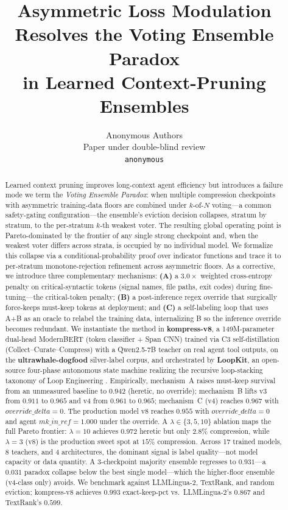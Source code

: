 \documentclass[10pt,letterpaper]{article}
\title{Asymmetric Loss Modulation Resolves the Voting Ensemble Paradox\\
       in Learned Context-Pruning Ensembles}
\author{Anonymous Authors\\
        Paper under double-blind review\\
        \texttt{anonymous}}  %
\date{}
\begin{document}
\maketitle

\begin{abstract}
Learned context pruning improves long-context agent efficiency but introduces
a failure mode we term the \emph{Voting Ensemble Paradox}: when multiple
compression checkpoints with asymmetric training-data floors are combined
under $k$-of-$N$ voting---a common safety-gating configuration---the
ensemble's eviction decision collapses, stratum by stratum, to the
per-stratum $k$-th weakest voter. The resulting global operating point is
Pareto-dominated by the frontier of any single strong checkpoint and, when
the weakest voter differs across strata, is occupied by no individual model.
We formalize this collapse via a conditional-probability proof over
indicator functions and trace it to per-stratum monotone-rejection
refinement across asymmetric floors. As a corrective, we introduce three
complementary mechanisms: \textbf{(A)} a $3.0\times$ weighted
cross-entropy penalty on critical-syntactic tokens (signal names, file
paths, exit codes) during fine-tuning---the critical-token penalty; \textbf{(B)}
a post-inference regex override that surgically force-keeps must-keep
tokens at deployment; and \textbf{(C)} a self-labeling loop that uses
A+B as an oracle to relabel the training data, internalizing B so the
inference override becomes redundant. We instantiate the method in
\textbf{kompress-v8}, a 149M-parameter dual-head ModernBERT (token
classifier + Span CNN) trained via C3 self-distillation
(Collect--Curate--Compress) with a Qwen2.5-7B teacher on real agent tool
outputs, on the \textbf{ultrawhale-dogfood} silver-label corpus, and
orchestrated by \textbf{LoopKit}, an open-source four-phase autonomous state
machine realizing the recursive loop-stacking taxonomy of Loop Engineering
\citep{osmani2026loop,greyling2026loop,langchain2026loops}. Empirically,
mechanism~A raises must-keep survival from an unmeasured baseline to $0.942$
(heretic, no override); mechanism~B lifts v3 from $0.911$ to $0.965$ and
v4 from $0.961$ to $0.965$; mechanism~C (v4) reaches $0.967$ with
$\mathit{override\_delta}{=}0$. The production model v8 reaches $0.955$ with
$\mathit{override\_delta}{=}0$ and agent $\mathit{mk\_in\_ref}{=}1.000$ under
the override. A $\lambda\in\{3,5,10\}$ ablation maps the full Pareto frontier:
$\lambda{=}10$ achieves $0.972$ heretic but only $2.8\%$ compression, while
$\lambda{=}3$ (v8) is the production sweet spot at $15\%$ compression. Across
17 trained models, 8 teachers, and 4 architectures, the dominant signal is
label quality---not model capacity or data quantity. A 3-checkpoint majority
ensemble regresses to $0.931$---a $0.031$ paradox collapse below the best
single model---which the higher-floor ensemble (v4-class only) avoids.
We benchmark against LLMLingua-2,
TextRank, and random eviction; kompress-v8 achieves $0.993$ exact-keep-pct
vs.\ LLMLingua-2's $0.867$ and TextRank's $0.599$.
\end{abstract}
\end{document}
